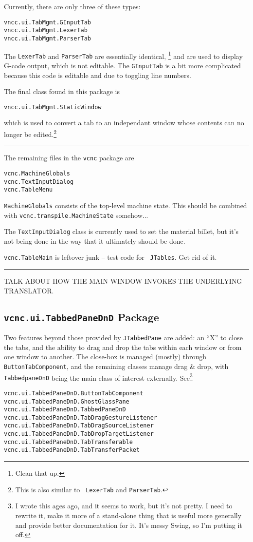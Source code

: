 \documentclass[titlepage,oneside,10pt]{article}
\newcommand\rulediv{\vskip 0mm\hfil\rule{0.4\textwidth}{0.4pt}\hfil\vskip 1mm}
\begin{document}
Currently, there are only three of these types:
\begin{verbatim}
vncc.ui.TabMgmt.GInputTab
vncc.ui.TabMgmt.LexerTab
vncc.ui.TabMgmt.ParserTab
\end{verbatim}
The {\tt LexerTab} and {\tt ParserTab} are essentially identical,
\footnote{Clean that up.} and are used to display G-code output, which
is not editable. The {\tt GInputTab} is a bit more complicated because
this code is editable and due to toggling line numbers.

The final class found in this package is 
\begin{verbatim}
vncc.ui.TabMgmt.StaticWindow
\end{verbatim}
which is used to convert a tab to an independant window whose contents
can no longer be edited.\footnote{This is also similar to {\tt
  LexerTab} and {\tt ParserTab}.}

\rulediv

The remaining files in the {\tt vcnc} package are 

\begin{verbatim}
vcnc.MachineGlobals
vcnc.TextInputDialog
vcnc.TableMenu
\end{verbatim}
{\tt MachineGlobals} consists of the top-level machine state. This
should be combined with {\tt vcnc.transpile.MachineState} somehow...

The {\tt TextInputDialog} class is currently used to set the material
billet, but it's not being done in the way that it ultimately should
be done.

{\tt vcnc.TableMain} is leftover junk -- test code for {\tt
  JTables}. Get rid of it.

\rulediv

TALK ABOUT HOW THE MAIN WINDOW INVOKES THE UNDERLYING TRANSLATOR.

\subsection{{\tt vcnc.ui.TabbedPaneDnD} Package}

Two features beyond those provided by {\tt JTabbedPane}
are added: an ``X'' to close the tabs, and the ability to drag and
drop the tabs within each window or from one window to another. The
close-box is managed (mostly) through {\tt ButtonTabComponent}, and
the remaining classes manage drag \& drop, with {\tt TabbedpaneDnD}
being the main class of interest externally. See\footnote{I wrote this
ages ago, and it seems to work, but it's not pretty. I need to rewrite
it, make it more of a stand-alone thing that is useful more generally
and provide better documentation for it. It's messy Swing, so I'm
putting it off. }
\begin{verbatim}
vcnc.ui.TabbedPaneDnD.ButtonTabComponent
vcnc.ui.TabbedPaneDnD.GhostGlassPane
vcnc.ui.TabbedPaneDnD.TabbedPaneDnD
vcnc.ui.TabbedPaneDnD.TabDragGestureListener
vcnc.ui.TabbedPaneDnD.TabDragSourceListener
vcnc.ui.TabbedPaneDnD.TabDropTargetListener
vcnc.ui.TabbedPaneDnD.TabTransferable
vcnc.ui.TabbedPaneDnD.TabTransferPacket
\end{verbatim}
\end{document}
